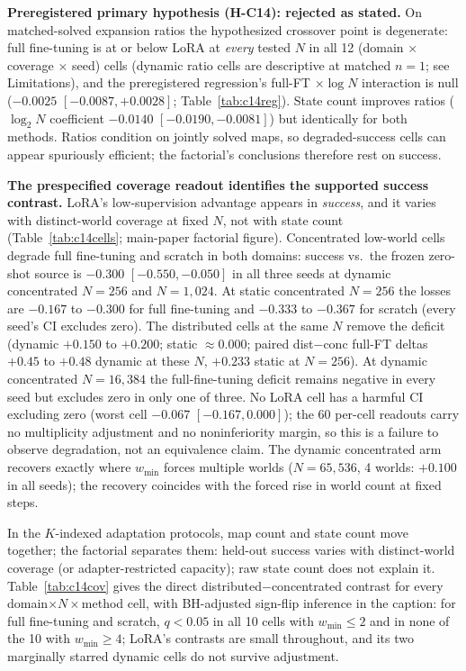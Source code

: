 \documentclass[letterpaper]{article} %
\begin{document}
\textbf{Preregistered primary hypothesis (H-C14): rejected as stated.} On matched-solved expansion ratios the hypothesized crossover point is degenerate: full fine-tuning is at or below LoRA at \emph{every} tested $N$ in all 12 (domain $\times$ coverage $\times$ seed) cells (dynamic ratio cells are descriptive at matched $n{=}1$; see Limitations), and the preregistered regression's full-FT $\times \log N$ interaction is null ($-0.0025$ $[-0.0087, +0.0028]$; Table~\ref{tab:c14reg}). State count improves ratios ($\log_2 N$ coefficient $-0.0140$ $[-0.0190, -0.0081]$) but identically for both methods. Ratios condition on jointly solved maps, so degraded-success cells can appear spuriously efficient; the factorial's conclusions therefore rest on success.

\textbf{The prespecified coverage readout identifies the supported success contrast.} LoRA's low-supervision advantage appears in \emph{success}, and it varies with distinct-world coverage at fixed $N$, not with state count (Table~\ref{tab:c14cells}; main-paper factorial figure). Concentrated low-world cells degrade full fine-tuning and scratch in both domains: success vs.\ the frozen zero-shot source is $-0.300$ $[-0.550,-0.050]$ in all three seeds at dynamic concentrated $N{=}256$ and $N{=}1{,}024$. At static concentrated $N{=}256$ the losses are $-0.167$ to $-0.300$ for full fine-tuning and $-0.333$ to $-0.367$ for scratch (every seed's CI excludes zero). The distributed cells at the same $N$ remove the deficit (dynamic $+0.150$ to $+0.200$; static $\approx 0.000$; paired dist$-$conc full-FT deltas $+0.45$ to $+0.48$ dynamic at these $N$, $+0.233$ static at $N{=}256$). At dynamic concentrated $N{=}16{,}384$ the full-fine-tuning deficit remains negative in every seed but excludes zero in only one of three. No LoRA cell has a harmful CI excluding zero (worst cell $-0.067$ $[-0.167, 0.000]$); the 60 per-cell readouts carry no multiplicity adjustment and no noninferiority margin, so this is a failure to observe degradation, not an equivalence claim. The dynamic concentrated arm recovers exactly where $w_{\min}$ forces multiple worlds ($N{=}65{,}536$, 4 worlds: $+0.100$ in all seeds); the recovery coincides with the forced rise in world count at fixed steps.

In the $K$-indexed adaptation protocols, map count and state count move together; the factorial separates them: held-out success varies with distinct-world coverage (or adapter-restricted capacity); raw state count does not explain it. Table~\ref{tab:c14cov} gives the direct distributed$-$concentrated contrast for every domain$\times N\times$method cell, with BH-adjusted sign-flip inference in the caption: for full fine-tuning and scratch, $q{<}0.05$ in all 10 cells with $w_{\min} \leq 2$ and in none of the 10 with $w_{\min} \geq 4$; LoRA's contrasts are small throughout, and its two marginally starred dynamic cells do not survive adjustment.
\end{document}
